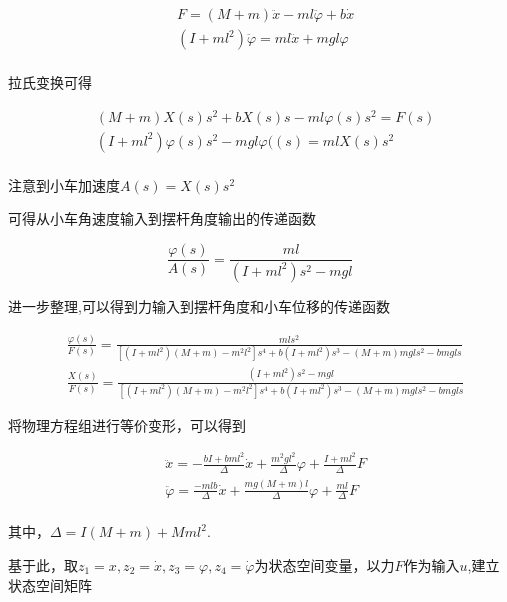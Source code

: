 \documentclass{MathorCupmodeling}
\begin{document}
\begin{equation}
\begin{aligned}
&F=(M+m)\ddot x-ml\ddot{\varphi}+b\dot x\\
&(I+ml^2)\ddot{\varphi}=ml\ddot x+mgl\varphi\\
\end{aligned}
\end{equation}

拉氏变换可得

\begin{equation}
\begin{aligned}
&(M+m)X(s)s^2+bX(s)s-ml\varphi(s)s^2=F(s)\\
&(I+ml^2)\varphi(s)s^2-mgl\varphi((s)=mlX(s)s^2\\
\end{aligned}
\end{equation}

注意到小车加速度$A(s)=X(s)s^2$

可得从小车角速度输入到摆杆角度输出的传递函数

\begin{equation}
\frac{\varphi(s)}{A(s)}=\frac{ml}{(I+ml^2)s^2-mgl}
\end{equation}

进一步整理,可以得到力输入到摆杆角度和小车位移的传递函数

\begin{equation}
\begin{aligned}
&\frac{\varphi(s)}{F(s)}=\frac{mls^2}{[(I+ml^2)(M+m)-m^2l^2]s^4+b(I+ml^2)s^3-(M+m)mgls^2-bmgls}\\
&\frac{X(s)}{F(s)}=\frac{(I+ml^2)s^2-mgl}{[(I+ml^2)(M+m)-m^2l^2]s^4+b(I+ml^2)s^3-(M+m)mgls^2-bmgls}
\end{aligned}
\end{equation}

将物理方程组进行等价变形，可以得到

\begin{equation}
\begin{aligned}
&\ddot x=-\frac{bI+bml^2}{\Delta}\dot x+\frac{m^2gl^2}{\Delta}\varphi+\frac{I+ml^2}{\Delta}F\\
&\ddot{\varphi}=\frac{-mlb}{\Delta}\dot x+\frac{mg(M+m)l}{\Delta}\varphi+\frac{ml}{\Delta}F\\
\end{aligned}
\end{equation}

其中，$\Delta=I(M+m)+Mml^2$.

基于此，取$z_1=x,z_2=\dot x,z_3=\varphi,z_4=\dot{\varphi}$为状态空间变量，以力$F$作为输入$u$,建立状态空间矩阵
\end{document}
